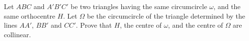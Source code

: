 Let $ABC$ and $A'B'C'$ be two triangles having the same circumcircle $\omega$, and the same orthocentre $H$. Let $\Omega$ be the circumcircle of the triangle determined by the lines $AA'$, $BB'$ and $CC'$. Prove that $H$, the centre of $\omega$, and the centre of $\Omega$ are collinear.

